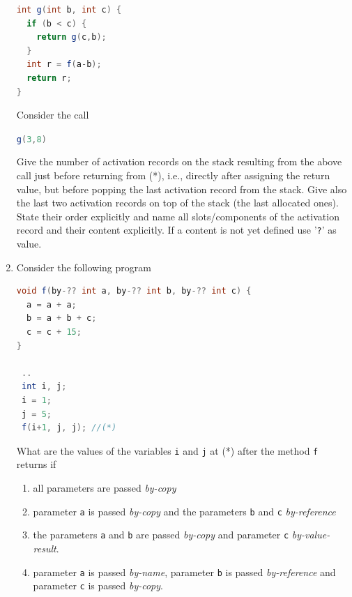 \documentclass{article}
\begin{document}
\begin{enumerate}
\begin{lstlisting}[language=Java, columns=flexible]
int g(int b, int c) {
  if (b < c) {
    return g(c,b); 
  }
  int r = f(a-b);
  return r;
}
\end{lstlisting}

Consider the call 
\begin{center}
  \lstinline[language=Java, columns=flexible]{g(3,8)} 
\end{center}
Give the number of activation records on the stack resulting from the
above call just before returning from (*), i.e., directly after
assigning the return value, but before popping the last activation
record from the stack. Give also the last two activation records on
top of the stack (the last allocated ones). State their order
explicitly and name all slots/components of the activation record and
their content explicitly. If a content is not yet defined use
'\texttt{?}' as value. 
\item Consider the following program
\begin{lstlisting}[language=Java, columns=flexible] 
void f(by-?? int a, by-?? int b, by-?? int c) {
  a = a + a;
  b = a + b + c;
  c = c + 15;
}

 ..
 int i, j;
 i = 1; 
 j = 5;
 f(i+1, j, j); //(*)
\end{lstlisting}

What are the values of the variables \lstinline!i! and \lstinline!j!
at (*) after the method \lstinline!f! returns if
\begin{enumerate}
  \item all parameters are passed \emph{by-copy}
  \item parameter \lstinline!a! is passed \emph{by-copy} and
    the parameters \lstinline!b! and \lstinline!c! \emph{by-reference}
  \item the parameters \lstinline!a! and \lstinline!b! are passed
    \emph{by-copy} and parameter \lstinline!c! \emph{by-value-result}.
  \item parameter \lstinline!a! is passed \emph{by-name}, parameter
    \lstinline!b! is passed \emph{by-reference} and parameter
    \lstinline!c! is passed \emph{by-copy}.
\end{enumerate} 
\end{enumerate}
\end{document}
